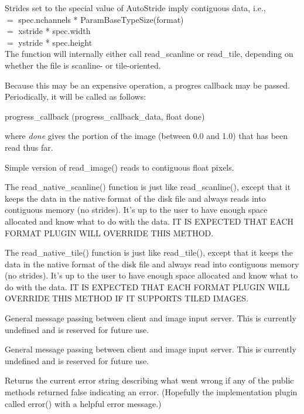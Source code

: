 Strides set to the special value of {\kw AutoStride} imply contiguous
data, i.e., \\
 $=$ {\kw spec.nchannels * ParamBaseTypeSize(format)} \\
 $=$ {\kw xstride * spec.width} \\
 $=$ {\kw ystride * spec.height} \\
The function will internally either call {\kw read_scanline} or 
{\kw read_tile}, depending on whether the file is scanline- or
tile-oriented.

Because this may be an expensive operation, a progres callback may be passed.
Periodically, it will be called as follows:\\
\begin{code}
    progress_callback (progress_callback_data, float done)
\end{code}
\noindent where \emph{done} gives the portion of the image 
(between 0.0 and 1.0) that has been read thus far.
\apiend

Simple version of {\kw read_image()} reads to contiguous float pixels.
\apiend

The {\kw read_native_scanline()} function is just like {\kw
  read_scanline()}, except that it keeps the data in the native format
of the disk file and always reads into contiguous memory (no strides).
It's up to the user to have enough space allocated and know what to do
with the data.  IT IS EXPECTED THAT EACH FORMAT PLUGIN WILL OVERRIDE
THIS METHOD.
\apiend

The {\kw read_native_tile()} function is just like {\kw read_tile()}, 
except that it keeps the data in the native format of the disk file and
always read into contiguous memory (no strides).  It's up to the user to
have enough space allocated and know what to do with the data.  IT IS
EXPECTED THAT EACH FORMAT PLUGIN WILL OVERRIDE THIS METHOD IF IT
SUPPORTS TILED IMAGES.
\apiend

General message passing between client and image input server.
This is currently undefined and is reserved for future use.
\apiend

General message passing between client and image input server.
This is currently undefined and is reserved for future use.
\apiend

Returns the current error string describing what went wrong if
any of the public methods returned {\kw false} indicating an error.
(Hopefully the implementation plugin called {\kw error()} with a
helpful error message.)
\apiend




\chapwidthend
